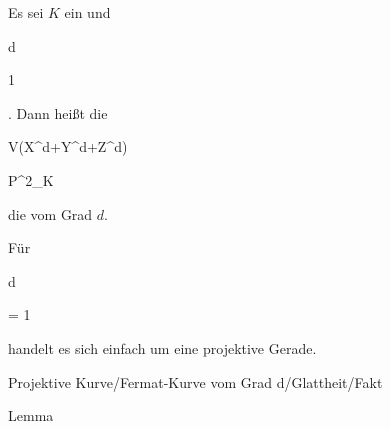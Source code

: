 
{}

{


Es sei $K$ ein
und


\mavergleichskette

{\vergleichskette

{d
}

{ \geq }{ 1
}

{  }{
}

{    }{
}

{   }{
}

}
{}{}{.}
Dann heißt die


\mavergleichskettedisp

{\vergleichskette

{ V(X^d+Y^d+Z^d)
}

{ \subseteq} { {\mathbb P}^{2}_{K}
}

{ } {
}

{ } {
}

{ } {
}

}
{}{}{}
die  vom Grad $d$.


}


Für


\mavergleichskette

{\vergleichskette

{d
}

{ = }{ 1
}

{  }{
}

{    }{
}

{   }{
}

}
{}{}{}
handelt es sich einfach um eine projektive Gerade.



{Projektive Kurve/Fermat-Kurve vom Grad d/Glattheit/Fakt}

{Lemma}

{}


